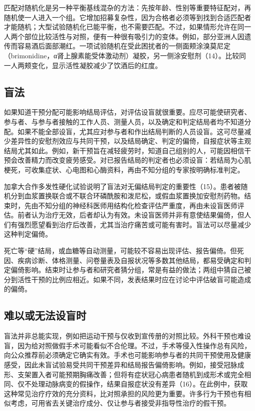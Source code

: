 匹配对随机化是另一种平衡基线混杂的方法：先按年龄、性别等重要特征配对，再随机使一人进入一个组。它增加招募复杂性，因为合格者必须等到找到合适匹配者才能随机；大型试验随机化已能平衡，也不需要匹配。不过，如果情形允许在同一人两个部位比较活性与对照，便有一种很有吸引力的变体。例如，部分亚洲人因遗传而容易酒后面部潮红。一项试验随机在受此困扰者的一侧面颊涂溴莫尼定（brimonidine，α肾上腺素能受体激动剂）凝胶，另一侧涂安慰剂（14）。比较同一人两颊变化，显示活性凝胶减少了饮酒后的红度。

\subsection{盲法}
如果知道干预分配可能影响结局评估，对评估设盲就很重要。应尽可能使研究者、参与者、与参与者接触的工作人员、测量人员，以及确定和判定结局者均不知道分配。如果不能全部设盲，尤其应对参与者和作出结局判断的人员设盲。这可尽量减少差异性的安慰剂效应与共同干预，以及结局确定、判定的偏倚，自报症状等主观结局尤其如此。例如，新干预旨在减轻疲劳时，知道自己组别的人，可能因相信干预会改善精力而改变疲劳感受。对已报告结局的判定者也必须设盲：若结局为心肌梗死，可收集症状、心电图和心酶资料，再由不知分组的专家按明确标准判定。

加拿大合作多发性硬化试验说明了盲法对无偏结局判定的重要性（15）。患者被随机分到血浆置换联合或不联合环磷酰胺和泼尼松，或假血浆置换加安慰剂药物。结束时，先由不知分组的神经科医师用结构化检查评估严重度，再由未设盲医师评估。前者认为治疗无效，后者却认为有效。未设盲医师并非有意使结果偏倚，但人们有强烈愿望看到治疗后改善，尤其当治疗痛苦或可能有害时。盲法可以尽量减少这种判定偏倚。

死亡等“硬”结局，或血糖等自动测量，可能较不容易出现评估、报告偏倚。但死因、疾病诊断、体格测量、问卷量表及自报状况等多数其他结局，都易受确定和判定偏倚影响。结束时让参与者和研究者猜分组，常是有益的做法；两组中猜自己被分到活性干预的比例应相近。如果不同，发表结果时应在讨论中评估破盲可能造成的偏倚。

\subsection{难以或无法设盲时}
盲法并非总能实现，例如把运动干预与仅收到宣传册的对照比较。外科干预也难设盲，因为给对照做假手术可能看似不合伦理。不过，手术等侵入性操作总有风险，向公众推荐前必须确定它确实有效。手术也可能影响参与者的共同干预使用及健康感受，因此未盲试验易受共同干预差异和结局报告偏倚影响。例如，接受冠脉成形、支架置入者可能预期胸痛改善；但将有症状冠心病患者随机到成形术或完全相同、仅不处理动脉病变的假操作，结果自报症状没有差异（16）。在此例中，获取这种常见治疗疗效的充分资料，比对照承担的风险更为重要。许多行为干预也有相似考虑，可用省去关键治疗成分、仅让参与者接受非指导性治疗的假干预。

